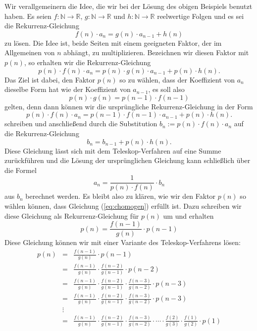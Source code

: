 Wir verallgemeinern die Idee, die wir bei der L\"osung des obigen Beispiels benutzt haben.  Es seien
$f:\mathbb{N} \rightarrow \mathbb{R}$, $g:\mathbb{N} \rightarrow \mathbb{R}$ und 
$h:\mathbb{N} \rightarrow \mathbb{R}$ 
reelwertige Folgen und es sei die Rekurrenz-Gleichung
\[ 
f(n) \cdot a_n = g(n) \cdot a_{n-1} + h(n)
\]
zu l\"osen.  Die Idee ist, beide Seiten mit einem geeigneten Faktor, der im Allgemeinen von $n$ abh\"angt, zu
multiplizieren.  Bezeichnen wir diesen Faktor mit $p(n)$, so erhalten wir die Rekurrenz-Gleichung
\[ 
p(n) \cdot f(n) \cdot a_n = p(n) \cdot g(n) \cdot a_{n-1} + p(n) \cdot h(n).
\]
Das Ziel ist dabei, den Faktor $p(n)$ so zu w\"ahlen, dass der Koeffizient von $a_n$ dieselbe Form hat wie der
Koeffizient von $a_{n-1}$, es soll also
\begin{equation}
  \label{eq:chomogen}
  p(n) \cdot g(n) = p(n-1) \cdot f(n-1)  
\end{equation}
gelten, denn dann k\"onnen wir die urspr\"ungliche Rekurrenz-Gleichung in der Form
\[ 
p(n) \cdot f(n) \cdot a_n = p(n-1) \cdot f(n-1) \cdot a_{n-1} + p(n) \cdot h(n).
\]
schreiben und anschlie{\ss}end durch die Substitution $b_n := p(n) \cdot f(n) \cdot a_n$ auf die
Rekurrenz-Gleichung 
\[ 
b_n = b_{n-1} + p(n) \cdot h(n).
\]
Diese Gleichung l\"asst sich mit dem Teleskop-Verfahren auf eine Summe zur\"uckf\"uhren und die L\"osung der
urspr\"unglichen Gleichung kann schlie{\ss}lich \"uber die Formel
\[ 
a_n = \frac{1}{p(n) \cdot f(n)} \cdot b_n
\]
aus $b_n$ berechnet werden.  Es bleibt also zu kl\"aren, wie wir den Faktor $p(n)$ so w\"ahlen k\"onnen, dass
Gleichung (\ref{eq:chomogen}) erf\"ullt ist. Dazu schreiben wir diese Gleichung als Rekurrenz-Gleichung f\"ur
$p(n)$ um und erhalten
\[ 
  p(n) = \frac{f(n-1)}{g(n)} \cdot p(n-1) 
\]
Diese Gleichung k\"onnen wir mit einer Variante des Teleskop-Verfahrens l\"osen:
\[ 
\begin{array}{lcl}
p(n) & = & \frac{f(n-1)}{g(n)} \cdot p(n-1)   \\[0.2cm]
     & = & \frac{f(n-1)}{g(n)} \cdot  \frac{f(n-2)}{g(n-1)} \cdot  p(n-2) \\[0.2cm]
     & = & \frac{f(n-1)}{g(n)} \cdot  \frac{f(n-2)}{g(n-1)} \cdot \frac{f(n-3)}{g(n-2)} \cdot  p(n-3) 
           \\[0.2cm]
     & = & \frac{f(n-1)}{g(n)} \cdot  \frac{f(n-2)}{g(n-1)} \cdot \frac{f(n-3)}{g(n-2)} \cdot  p(n-3) 
           \\[0.2cm]
     & \vdots & \\
     & = & \frac{f(n-1)}{g(n)} \cdot  \frac{f(n-2)}{g(n-1)} \cdot \frac{f(n-3)}{g(n-2)} \cdot \cdots
           \cdot \frac{f(2)}{g(3)} \cdot \frac{f(1)}{g(2)} \cdot p(1) 
           \\[0.2cm]
\end{array}
\]
